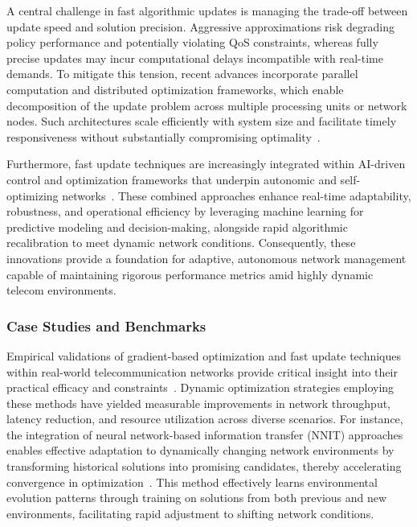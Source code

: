 \documentclass[sigconf]{acmart}
\begin{document}
A central challenge in fast algorithmic updates is managing the trade-off between update speed and solution precision. Aggressive approximations risk degrading policy performance and potentially violating QoS constraints, whereas fully precise updates may incur computational delays incompatible with real-time demands. To mitigate this tension, recent advances incorporate parallel computation and distributed optimization frameworks, which enable decomposition of the update problem across multiple processing units or network nodes. Such architectures scale efficiently with system size and facilitate timely responsiveness without substantially compromising optimality~\cite{ref11,ref6}.

Furthermore, fast update techniques are increasingly integrated within AI-driven control and optimization frameworks that underpin autonomic and self-optimizing networks~\cite{ref2,ref6,ref11}. These combined approaches enhance real-time adaptability, robustness, and operational efficiency by leveraging machine learning for predictive modeling and decision-making, alongside rapid algorithmic recalibration to meet dynamic network conditions. Consequently, these innovations provide a foundation for adaptive, autonomous network management capable of maintaining rigorous performance metrics amid highly dynamic telecom environments.

\subsubsection{Case Studies and Benchmarks}

Empirical validations of gradient-based optimization and fast update techniques within real-world telecommunication networks provide critical insight into their practical efficacy and constraints~\cite{ref1,ref4,ref10,ref37,ref47}. Dynamic optimization strategies employing these methods have yielded measurable improvements in network throughput, latency reduction, and resource utilization across diverse scenarios. For instance, the integration of neural network-based information transfer (NNIT) approaches enables effective adaptation to dynamically changing network environments by transforming historical solutions into promising candidates, thereby accelerating convergence in optimization~\cite{ref47}. This method effectively learns environmental evolution patterns through training on solutions from both previous and new environments, facilitating rapid adjustment to shifting network conditions.
\end{document}
